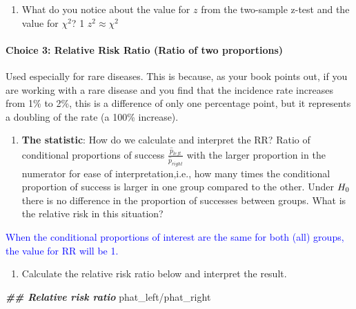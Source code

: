 \documentclass[
]{article}
\newenvironment{Shaded}{\begin{snugshade}}{\end{snugshade}}
\newcommand{\DocumentationTok}[1]{\textcolor[rgb]{0.56,0.35,0.01}{\textbf{\textit{#1}}}}
\newcommand{\NormalTok}[1]{#1}
\newcommand{\SpecialCharTok}[1]{\textcolor[rgb]{0.00,0.00,0.00}{#1}}
\providecommand{\tightlist}{%
  \setlength{\itemsep}{0pt}\setlength{\parskip}{0pt}}
\begin{document}
\begin{enumerate}
\def\labelenumi{(\arabic{enumi})}
\setcounter{enumi}{12}
\tightlist
\item
  What do you notice about the value for \(z\) from the two-sample
  z-test and the value for \(\chi^2\)? 1 \textbf{\(z^2 \approx \chi^2\)}
\end{enumerate}

\vspace{0.5in}

\hypertarget{choice-3-relative-risk-ratio-ratio-of-two-proportions}{%
\paragraph{Choice 3: Relative Risk Ratio (Ratio of two
proportions)}\label{choice-3-relative-risk-ratio-ratio-of-two-proportions}}

Used especially for rare diseases. This is because, as your book points
out, if you are working with a rare disease and you find that the
incidence rate increases from 1\% to 2\%, this is a difference of only
one percentage point, but it represents a doubling of the rate (a 100\%
increase).

\begin{enumerate}
\def\labelenumi{(\arabic{enumi})}
\setcounter{enumi}{13}
\tightlist
\item
  \textbf{The statistic}: How do we calculate and interpret the RR?
  Ratio of conditional proportions of success
  \(\frac{\hat{p}_{left}}{\hat{p}_{right}}\) with the larger proportion
  in the numerator for ease of interpretation,i.e., how many times the
  conditional proportion of success is larger in one group compared to
  the other. Under \(\small H_0\) there is no difference in the
  proportion of successes between groups. What is the relative risk in
  this situation?
\end{enumerate}

\textcolor{blue}{When the conditional proportions of interest are the same for both (all) groups, the value for RR will be 1.}

\vspace{0.5in}

\begin{enumerate}
\def\labelenumi{(\arabic{enumi})}
\setcounter{enumi}{14}
\tightlist
\item
  Calculate the relative risk ratio below and interpret the result.
\end{enumerate}

\begin{Shaded}
\begin{Highlighting}[]
\DocumentationTok{\#\# Relative risk ratio}
\NormalTok{phat\_left}\SpecialCharTok{/}\NormalTok{phat\_right}
\end{Highlighting}
\end{Shaded}
\end{document}
